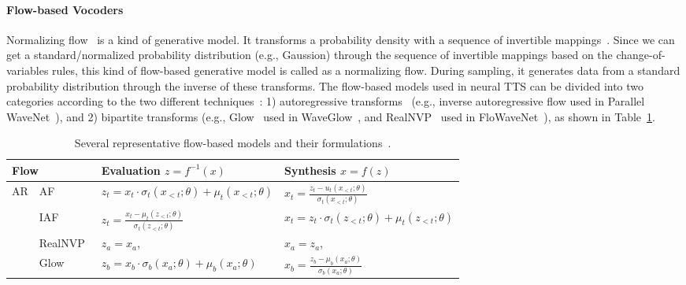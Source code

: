 \documentclass{article}
\begin{document}
\paragraph{Flow-based Vocoders}
Normalizing flow~\cite{dinh2014nice,dinh2016density,rezende2015variational,kingma2016improved,kingma2018glow} is a kind of generative model. It transforms a probability density with a sequence of invertible mappings~\cite{rezende2015variational}. Since we can get a standard/normalized probability distribution (e.g., Gaussion) through the sequence of invertible mappings based on the change-of-variables rules, this kind of flow-based generative model is called as a normalizing flow. During sampling, it generates data from a standard probability distribution through the inverse of these transforms. The flow-based models used in neural TTS can be divided into two categories according to the two different techniques~\cite{papamakarios2019normalizing}: 1) autoregressive transforms~\cite{kingma2016improved} (e.g., inverse autoregressive flow used in Parallel WaveNet~\cite{oord2018parallel}), and 2) bipartite transforms (e.g., Glow~\cite{kingma2018glow} used in WaveGlow~\cite{prenger2019waveglow}, and RealNVP~\cite{dinh2016density} used in FloWaveNet~\cite{kim2019flowavenet}), as shown in Table~\ref{tab_flow_summary}.

\begin{table}[h!]
\small
	\caption{Several representative flow-based models and their formulations~\cite{ping2020waveflow}.}
	\centering
	\begin{tabular}{l |l | l |l}
	\toprule
		\multicolumn{2}{l|}{Flow} & Evaluation $z=f^{-1}(x)$ & Synthesis $x=f(z)$\\
		\midrule
		\multirow{3}{*}{AR} &  AF~\cite{papamakarios2017masked} & $z_t=x_t\cdot \sigma_t(x_{<t}; \theta) + \mu_t (x_{<t};\theta)$ &  $x_t=\frac{z_t-u_t(x_{<t};\theta)}{\sigma_t(x_{<t};\theta)}$   \\
		\cmidrule{2-4}
		          &  IAF~\cite{kingma2016improved} & $z_t=\frac{x_t-\mu_t(z_{<t};\theta)}{\sigma_t(z_{<t};\theta)}$ &$x_t=z_t\cdot \sigma_t(z_{<t}; \theta) + \mu_t (z_{<t};\theta)$   \\
		\midrule
		\multirow{3}{*}{Bipartite} & RealNVP~\cite{dinh2016density} & $z_a = x_a$,  & $x_a = z_a$,   \\
		\cmidrule{2-2}
		          &  Glow~\cite{kingma2018glow} & $z_b=x_b\cdot \sigma_b(x_a;\theta) + \mu_b(x_a;\theta)$ &		          $x_b=\frac{z_b-\mu_b(x_a;\theta)}{\sigma_b(x_a;\theta)}$ \\
        \bottomrule
	\end{tabular}
	\vspace{0.3cm}
	\label{tab_flow_summary}
\end{table}
\end{document}
